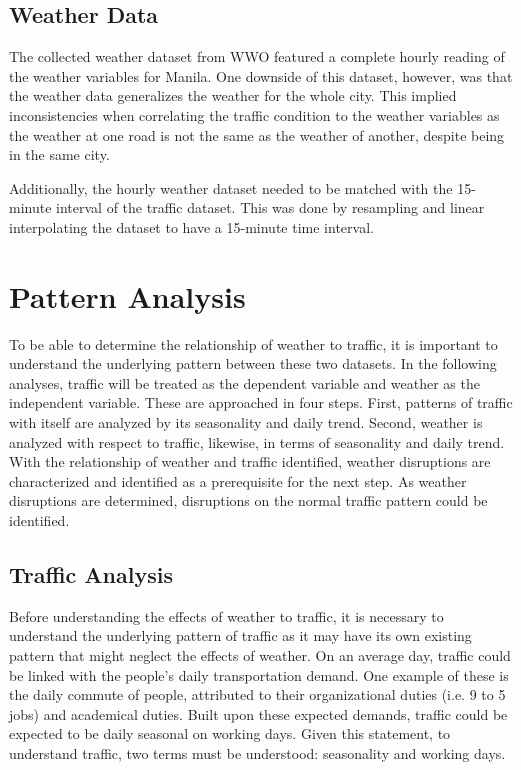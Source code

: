\subsection{Weather Data}
The collected weather dataset from WWO featured a complete hourly reading of the weather variables for Manila. One downside of this dataset, however, was that the weather data generalizes the weather for the whole city. This implied inconsistencies when correlating the traffic condition to the weather variables as the weather at one road is not the same as the weather of another, despite being in the same city.

Additionally, the hourly weather dataset needed to be matched with the 15-minute interval of the traffic dataset. This was done by resampling and linear interpolating the dataset to have a 15-minute time interval.

\section{Pattern Analysis}
To be able to determine the relationship of weather to traffic, it is important to understand the underlying pattern between these two datasets. In the following analyses, traffic will be treated as the dependent variable and weather as the independent variable. These are approached in four steps. First, patterns of traffic with itself are analyzed by its seasonality and daily trend. Second, weather is analyzed with respect to traffic, likewise, in terms of seasonality and daily trend. With the relationship of weather and traffic identified, weather disruptions are characterized and identified as a prerequisite for the next step. As weather disruptions are determined, disruptions on the normal traffic pattern could be identified.

\subsection{Traffic Analysis}
Before understanding the effects of weather to traffic, it is necessary to understand the underlying pattern of traffic as it may have its own existing pattern that might neglect the effects of weather. On an average day, traffic could be linked with the people's daily transportation demand. One example of these is the daily commute of people, attributed to their organizational duties (i.e. 9 to 5 jobs) and academical duties. Built upon these expected demands, traffic could be expected to be daily seasonal on working days. Given this statement, to understand traffic, two terms must be understood: seasonality and working days.

